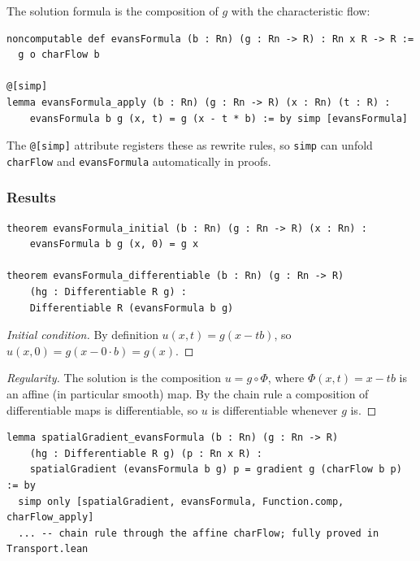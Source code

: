 ﻿\documentclass[12pt, a4paper]{article}
\renewcommand{\_}{\origunderscore\allowbreak}
\theoremstyle{definition}
\theoremstyle{plain}
\begin{document}
The solution formula is the composition of $g$ with the characteristic flow:

\begin{lstlisting}[caption={Evans formula}]
noncomputable def evansFormula (b : Rn) (g : Rn -> R) : Rn x R -> R :=
  g o charFlow b

@[simp]
lemma evansFormula_apply (b : Rn) (g : Rn -> R) (x : Rn) (t : R) :
    evansFormula b g (x, t) = g (x - t * b) := by simp [evansFormula]
\end{lstlisting}

The \texttt{@[simp]} attribute registers these as rewrite rules, so \texttt{simp}
can unfold \texttt{charFlow} and \texttt{evansFormula} automatically in proofs.

\subsubsection{Results}

\begin{lstlisting}[caption={Initial condition and regularity (proved)}]
theorem evansFormula_initial (b : Rn) (g : Rn -> R) (x : Rn) :
    evansFormula b g (x, 0) = g x

theorem evansFormula_differentiable (b : Rn) (g : Rn -> R)
    (hg : Differentiable R g) :
    Differentiable R (evansFormula b g)
\end{lstlisting}

\begin{proof}[Initial condition]
By definition $u(x,t) = g(x - tb)$, so $u(x,0) = g(x - 0\cdot b) = g(x)$.
\end{proof}

\begin{proof}[Regularity]
The solution is the composition $u = g\circ\Phi$, where $\Phi(x,t) = x - tb$ is an affine
(in particular smooth) map. By the chain rule a composition of differentiable maps is
differentiable, so $u$ is differentiable whenever $g$ is.
\end{proof}

\begin{lstlisting}[caption={Spatial gradient pulls back along charFlow (proved)}]
lemma spatialGradient_evansFormula (b : Rn) (g : Rn -> R)
    (hg : Differentiable R g) (p : Rn x R) :
    spatialGradient (evansFormula b g) p = gradient g (charFlow b p) := by
  simp only [spatialGradient, evansFormula, Function.comp, charFlow_apply]
  ... -- chain rule through the affine charFlow; fully proved in Transport.lean
\end{lstlisting}
\end{document}
